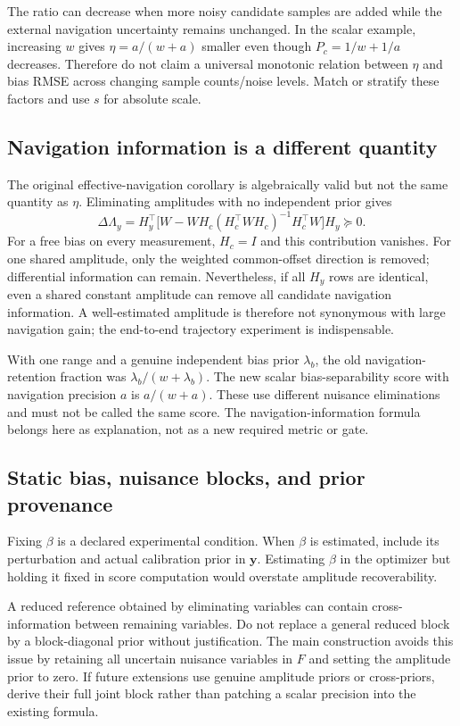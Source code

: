 \documentclass[conference]{IEEEtran}
\begin{document}
The ratio can decrease when more noisy candidate samples are added while the external navigation uncertainty remains unchanged. In the scalar example, increasing $w$ gives $\eta=a/(w+a)$ smaller even though $P_c=1/w+1/a$ decreases. Therefore do not claim a universal monotonic relation between $\eta$ and bias RMSE across changing sample counts/noise levels. Match or stratify these factors and use $s$ for absolute scale.

\subsection{Navigation information is a different quantity}
The original effective-navigation corollary is algebraically valid but not the same quantity as $\eta$. Eliminating amplitudes with no independent prior gives
\begin{equation}
 \Delta\Lambda_y=H_y^\top\big[W-WH_c
 (H_c^\top WH_c)^{-1}H_c^\top W\big]H_y\succeq0.
 \label{eq:nav_note}
\end{equation}
For a free bias on every measurement, $H_c=I$ and this contribution vanishes. For one shared amplitude, only the weighted common-offset direction is removed; differential information can remain. Nevertheless, if all $H_y$ rows are identical, even a shared constant amplitude can remove all candidate navigation information. A well-estimated amplitude is therefore not synonymous with large navigation gain; the end-to-end trajectory experiment is indispensable.

With one range and a genuine independent bias prior $\lambda_b$, the old navigation-retention fraction was $\lambda_b/(w+\lambda_b)$. The new scalar bias-separability score with navigation precision $a$ is $a/(w+a)$. These use different nuisance eliminations and must not be called the same score. The navigation-information formula belongs here as explanation, not as a new required metric or gate.

\subsection{Static bias, nuisance blocks, and prior provenance}
Fixing $\beta$ is a declared experimental condition. When $\beta$ is estimated, include its perturbation and actual calibration prior in $\mathbf y$. Estimating $\beta$ in the optimizer but holding it fixed in score computation would overstate amplitude recoverability.

A reduced reference obtained by eliminating variables can contain cross-information between remaining variables. Do not replace a general reduced block by a block-diagonal prior without justification. The main construction avoids this issue by retaining all uncertain nuisance variables in $F$ and setting the amplitude prior to zero. If future extensions use genuine amplitude priors or cross-priors, derive their full joint block rather than patching a scalar precision into the existing formula.
\end{document}
